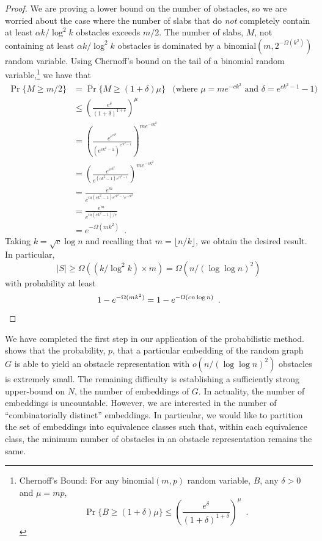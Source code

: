 \documentclass{patmorin}
\begin{document}
\begin{proof}
We are proving a lower bound on the number of obstacles, so we are
worried about the case where the number of slabs that do \emph{not}
completely contain at least $\alpha k/\log^2 k$ obstacles exceeds $m/2$.
The number of slabs, $M$, not containing at least $\alpha k/\log^2 k$
obstacles is dominated by a binomial$(m,2^{-\Omega(k^2)})$ random
variable.  Using Chernoff's bound on the tail of a binomial random
variable,\footnote{%
  Chernoff's Bound: For any binomial$(m,p)$ random variable, $B$,
  any $\delta>0$ and $\mu=mp$, 
  \[ \Pr\{B\ge (1+\delta)\mu\}
     \le \left(\frac{e^{\delta}}{(1+\delta)^{1+\delta}}\right)^{\mu} 
       \enspace . 
  \]}
we have that
\begin{align*}
  \Pr\{M \ge m/2\} & = \Pr\{M\ge (1+\delta)\mu\}
    & \text{(where $\mu=me^{-ck^2}$ and $\delta=e^{ck^2-1}-1$)} \\
    & \le \left(\frac{e^{\delta}}{(1+\delta)^{1+\delta}}\right)^{\mu} \\
    & = \left(\frac{e^{e^{ck^2}}}{(e^{ck^2-1})^{e^{ck^2-1}}}\right)^{me^{-ck^2}}\\
    & = \left(\frac{e^{e^{ck^2}}}{e^{(ck^2-1)e^{ck^2-1}}}\right)^{me^{-ck^2}}\\
    & = \frac{e^{m}}{e^{m(ck^2-1)e^{ck^2-1}e^{-ck^2}}} \\
    & = \frac{e^{m}}{e^{m(ck^2-1)/e}} \\
    & = e^{-\Omega(mk^2)} \enspace .
\end{align*}
Taking $k=\sqrt{c}\log n$ and recalling that $m=\lfloor n/k\rfloor$, we obtain
the desired result.  In particular,
\[
    |S| \ge \Omega\left(\left(k/\log^2 k\right)\times m \right)
      = \Omega\left(n/(\log\log n)^2\right)
\]
with probability at least
\[
    1-e^{-\Omega(mk^2)} = 1-e^{-\Omega(cn\log n)} \enspace . \qedhere
\]
\end{proof}

We have completed the first step in our application of the probabilistic
method.   shows that the probability, $p$, that a
particular embedding of the random graph $G$ is able to yield an obstacle
representation with $o(n/(\log\log n)^2)$ obstacles is extremely small.
The remaining difficulty is establishing a sufficiently strong upper-bound
on $N$, the number of embeddings of $G$. In actuality, the number of
embeddings is uncountable.  However, we are interested in the number of
``combinatorially distinct'' embeddings.  In particular, we would like
to partition the set of embeddings into equivalence classes such that,
within each equivalence class, the minimum number of obstacles in an
obstacle representation remains the same.
\end{document}
